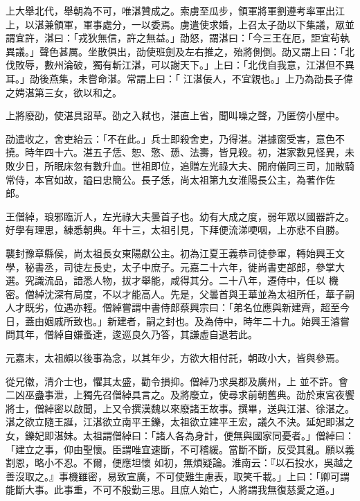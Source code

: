 \begin{pinyinscope}
 上大舉北代，舉朝為不可，唯湛贊成之。索虜至瓜步，領軍將軍劉遵考率軍出江上，以湛兼領軍，軍事處分，一以委焉。虜遣使求婚，上召太子劭以下集議，眾並謂宜許，湛曰：「戎狄無信，許之無益。」劭怒，謂湛曰：「今三王在厄，詎宜茍執異議。」聲色甚厲。坐散俱出，劭使班劍及左右推之，殆將側倒。劭又謂上曰：「北伐敗辱，數州淪破，獨有斬江湛，可以謝天下。」上曰：「北伐自我意，江湛但不異耳。」劭後燕集，未嘗命湛。常謂上曰：「
 江湛佞人，不宜親也。」上乃為劭長子偉之娉湛第三女，欲以和之。



 上將廢劭，使湛具詔草。劭之入弒也，湛直上省，聞叫噪之聲，乃匿傍小屋中。



 劭遣收之，舍吏紿云：「不在此。」兵士即殺舍吏，乃得湛。湛據窗受害，意色不撓。時年四十六。湛五子恁、恕、憼、愻、法壽，皆見殺。初，湛家數見怪異，未敗少日，所眠床忽有數升血。世祖即位，追贈左光祿大夫、開府儀同三司，加散騎常侍，本官如故，謚曰忠簡公。長子恁，尚太祖第九女淮陽長公主，為著作佐
 郎。



 王僧綽，琅邪臨沂人，左光祿大夫曇首子也。幼有大成之度，弱年眾以國器許之。好學有理思，練悉朝典。年十三，太祖引見，下拜便流涕哽咽，上亦悲不自勝。



 襲封豫章縣侯，尚太祖長女東陽獻公主。初為江夏王義恭司徒參軍，轉始興王文學，秘書丞，司徒左長史，太子中庶子。元嘉二十六年，徙尚書吏部郎，參掌大選。究識流品，諳悉人物，拔才舉能，咸得其分。二十八年，遷侍中，任以
 機密。僧綽沈深有局度，不以才能高人。先是，父曇首與王華並為太祖所任，華子嗣人才既劣，位遇亦輕。僧綽嘗謂中書侍郎蔡興宗曰：「弟名位應與新建齊，超至今日，蓋由姻戚所致也。」新建者，嗣之封也。及為侍中，時年二十九。始興王濬嘗問其年，僧綽自嫌蚤達，逡巡良久乃答，其謙虛自退若此。



 元嘉末，太祖頗以後事為念，以其年少，方欲大相付託，朝政小大，皆與參焉。



 從兄徽，清介士也，懼其太盛，勸令損抑。僧綽乃求吳郡及廣州，上
 並不許。會二凶巫蠱事泄，上獨先召僧綽具言之。及將廢立，使尋求前朝舊典。劭於東宮夜饗將士，僧綽密以啟聞，上又令撰漢魏以來廢諸王故事。撰畢，送與江湛、徐湛之。湛之欲立隨王誕，江湛欲立南平王鑠，太祖欲立建平王宏，議久不決。延妃即湛之女，鑠妃即湛妹。太祖謂僧綽曰：「諸人各為身計，便無與國家同憂者。」僧綽曰：「建立之事，仰由聖懷。臣謂唯宜速斷，不可稽緩。當斷不斷，反受其亂。願以義割恩，略小不忍。不爾，便應坦懷
 如初，無煩疑論。淮南云：『以石投水，吳越之善沒取之。』事機雖密，易致宣廣，不可使難生慮表，取笑千載。」上曰：「卿可謂能斷大事。此事重，不可不殷勤三思。且庶人始亡，人將謂我無復慈愛之道。」




\end{pinyinscope}
